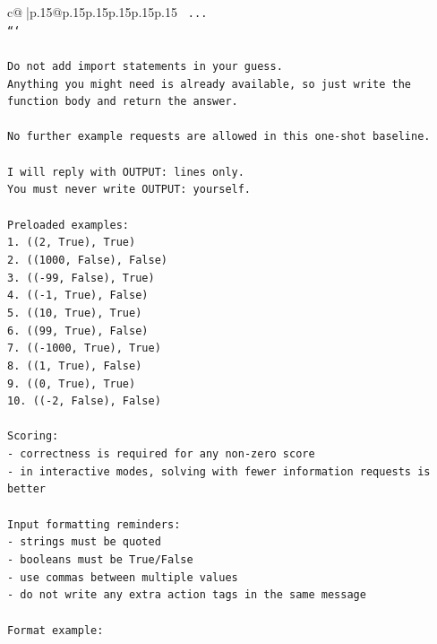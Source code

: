 \documentclass{article}
\begin{document}
{\begin{supertabular}{c@{$\;$}|p{.15\linewidth}@{}p{.15\linewidth}p{.15\linewidth}p{.15\linewidth}p{.15\linewidth}p{.15\linewidth}}
{{{\texttt{    ...} \\
\texttt{```} \\
\\ 
\texttt{Do not add import statements in your guess.} \\
\texttt{Anything you might need is already available, so just write the function body and return the answer.} \\
\\ 
\texttt{No further example requests are allowed in this one{-}shot baseline.} \\
\\ 
\texttt{I will reply with OUTPUT: lines only.} \\
\texttt{You must never write OUTPUT: yourself.} \\
\\ 
\texttt{Preloaded examples:} \\
\texttt{1. ((2, True), True)} \\
\texttt{2. ((1000, False), False)} \\
\texttt{3. (({-}99, False), True)} \\
\texttt{4. (({-}1, True), False)} \\
\texttt{5. ((10, True), True)} \\
\texttt{6. ((99, True), False)} \\
\texttt{7. (({-}1000, True), True)} \\
\texttt{8. ((1, True), False)} \\
\texttt{9. ((0, True), True)} \\
\texttt{10. (({-}2, False), False)} \\
\\ 
\texttt{Scoring:} \\
\texttt{{-} correctness is required for any non{-}zero score} \\
\texttt{{-} in interactive modes, solving with fewer information requests is better} \\
\\ 
\texttt{Input formatting reminders:} \\
\texttt{{-} strings must be quoted} \\
\texttt{{-} booleans must be True/False} \\
\texttt{{-} use commas between multiple values} \\
\texttt{{-} do not write any extra action tags in the same message} \\
\\ 
\texttt{Format example:} \\
}}}
\end{supertabular}}
\end{document}
